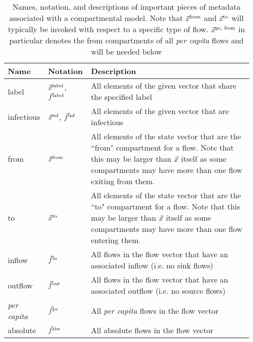 \begin{table}
\centering
    \begin{tabular}{|m{1.5cm}|m{1.5cm}|m{30em}|}
        \hline
        Name & Notation & Description \\\hline
        label & $\vec{x}^{\text{label}}$, $\vec{f}^{\text{label}}$ & All elements of the given vector that share the specified label \\\hline
        infectious & $\vec{x}^{\text{inf}}$, $\vec{f}^{\text{inf}}$ & All elements of the given vector that are infectious \\\hline
        from & $\vec{x}^\text{from}$ & All elements of the state vector that are the ``from" compartment for a flow. Note that this may be larger than $\vec{x}$ itself as some compartments may have more than one flow exiting from them. \\\hline
        to & $\vec{x}^\text{to}$ & All elements of the state vector that are the ``to" compartment for a flow. Note that this may be larger than $\vec{x}$ itself as some compartments may have more than one flow entering them. \\\hline
        inflow & $\vec{f}^\text{in}$ & All flows in the flow vector that have an associated inflow (i.e. no sink flows) \\\hline
        outflow & $\vec{f}^\text{out}$ & All flows in the flow vector that have an associated outflow (i.e. no source flows) \\\hline
        \emph{per capita} & $\vec{f}^\text{pc}$ & All \emph{per capita} flows in the flow vector \\\hline
        absolute & $\vec{f}^\text{abs}$ & All absolute flows in the flow vector \\\hline
    \end{tabular}
    \caption{Names, notation, and descriptions of important pieces of metadata associated with a compartmental model. Note that $\vec{x}^\text{from}$ and $\vec{x}^\text{to}$ will typically be invoked with respect to a specific type of flow. $\vec{x}^\text{pc, from}$ in particular denotes the from compartments of all \emph{per capita} flows and will be needed below}
    \label{tab:projections}
\end{table}
    
